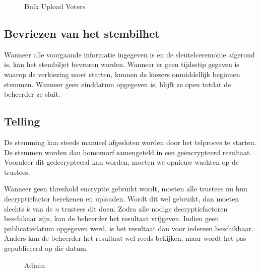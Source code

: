 \begin{figure}
  \caption{Bulk Upload Voters}
  \label{fig:proc:voters_upload}
\end{figure}

\subsection{Bevriezen van het stembilhet}

Wanneer alle voorgaande informatie ingegeven is en de sleutelceremonie afgerond is, kan het stembiljet bevroren worden. Wanneer er geen tijdsstip gegeven is waarop de verkiezing moet starten, kunnen de kiezers onmiddellijk beginnen stemmen. Wanneer geen einddatum opgegeven is, blijft ze open totdat de beheerder ze sluit.

\subsection{Telling}


De stemming kan steeds manueel afgesloten worden door het telproces te starten. De stemmen worden dan homomorf samengeteld in een geëncrypteerd resultaat. Vooraleer dit gedecrypteerd kan worden, moeten we opnieuw wachten op de trustees.

\npar Wanneer geen threshold encryptie gebruikt wordt, moeten alle trustees nu hun decryptiefactor berekenen en uploaden. Wordt dit wel gebruikt, dan moeten slechts $k$ van de $n$ trustees dit doen. Zodra alle nodige decryptiefactoren beschikaar zijn, kan de beheerder het resultaat vrijgeven. Indien geen publicatiedatum opgegeven werd, is het resultaat dan voor iedereen beschikbaar. Anders kan de beheerder het resultaat wel reeds bekijken, maar wordt het pas gepubliceerd op die datum.

\begin{figure}
  \caption{Admin}
  \label{fig:proc:elections_admin}
\end{figure}
